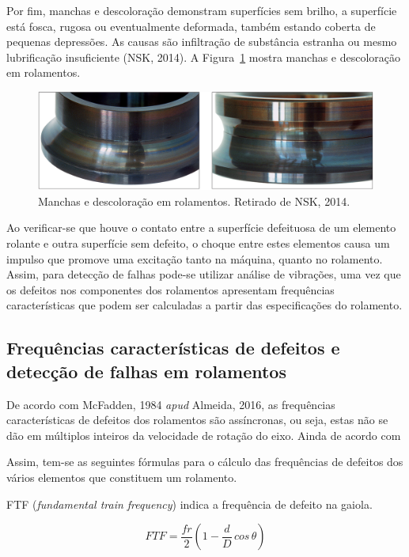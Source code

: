 \documentclass[
	12pt,				
	oneside,			
	a4paper,			
	english,			
	brazil,			
	]{abntex2ppgsi}
\begin{document}
Por fim, manchas e descoloração demonstram superfícies sem brilho, a superfície está fosca, rugosa ou eventualmente deformada, também estando coberta de pequenas depressões. As causas são infiltração de substância estranha ou mesmo lubrificação insuficiente (NSK, 2014). A Figura~\ref{manchas_nsk} mostra manchas e descoloração em rolamentos.

\begin{figure}[H]
\centering
\includegraphics[width=\textwidth,height=\textheight,keepaspectratio]{manchas_nsk}
\caption {Manchas e descoloração em rolamentos. Retirado de NSK, 2014.}
\label{manchas_nsk}
\end{figure}

Ao verificar-se que houve o contato entre a superfície defeituosa de um elemento rolante e outra superfície sem defeito, o choque entre estes elementos causa um impulso que promove uma excitação tanto na máquina, quanto no rolamento. Assim, para detecção de falhas pode-se utilizar análise de vibrações, uma vez que os defeitos nos componentes dos rolamentos apresentam frequências características que podem ser calculadas a partir das especificações do rolamento. 


\subsection{\textbf{Frequências características de defeitos e detecção de falhas em rolamentos}}

De acordo com McFadden, 1984 \textit{apud} Almeida, 2016, as frequências características de defeitos dos rolamentos são assíncronas, ou seja, estas não se dão em múltiplos inteiros da velocidade de rotação do eixo. Ainda de acordo com 

Assim, tem-se as seguintes fórmulas para o cálculo das frequências de defeitos dos vários  elementos que constituem um rolamento. 

FTF (\textit{fundamental train frequency}) indica a frequência de defeito na gaiola.

\begin{equation}
	FTF = \frac{fr}{2} \left ( 1 - \frac{d}{D} \,cos \, \theta \right ) 
	\label{eq: FTF}
\end{equation}
\end{document}
